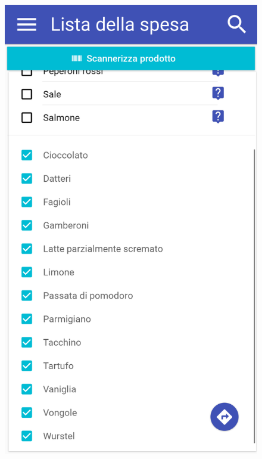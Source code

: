 \begin{figure}[H]
	\begin{minipage}{.49\textwidth}
		\includegraphics[width=\textwidth]{img/wireframe/lista_della_spesa_scrolling.png}
	\end{minipage}
	\begin{minipage}{.49\textwidth}

\end{minipage}
\end{figure}
